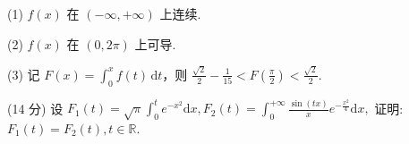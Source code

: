 (1) $f(x)$ 在 $(- \infty, + \infty)$ 上连续.\par
(2) $f(x)$ 在 $(0,2\pi)$ 上可导.\par
(3) 记 $F(x) = \int_{0}^{x} f(t) \, \mathrm{d}t$，则 $\frac{\sqrt{2}}{2} - \frac{1}{15} < F\left(\frac{\pi}{2}\right) < \frac{\sqrt{2}}{2}$.\par
\par{}
(14 分) 设 $F_{1}(t) = \sqrt{\pi} \int_{0}^{t} e^{-x^{2}} \mathrm{d}x, F_{2}(t) = \int_{0}^{+\infty} \frac{\sin(tx)}{x} e^{-\frac{x^{2}}{4}} \mathrm{d}x,$ 证明: $F_{1}(t) = F_{2}(t), t \in \mathbb{R}$.\par
